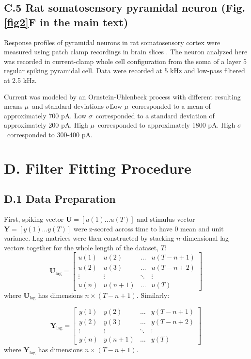 \subsection*{C.5 Rat somatosensory pyramidal neuron (Fig. \ref{fig2}F in the main text)}
Response profiles of pyramidal neurons in rat somatosensory cortex were measured using patch clamp recordings in brain slices \citep{rauch_lacamera_fusi2003noise}. The neuron analyzed here was recorded in current-clamp whole cell configuration from the soma of a layer 5 regular spiking pyramidal cell. Data were recorded at 5 kHz and low-pass filtered at 2.5 kHz.

Current was modeled by an Ornstein-Uhlenbeck process with different resulting means $\mu$\ and standard deviations $\sigma$\. Low $\mu$\ corresponded to a mean of approximately 700 pA. Low $\sigma$\ corresponded to a standard deviation of approximately 200 pA. High $\mu$\ corresponded to approximately 1800 pA. High $\sigma$\ corresponded to 300-400 pA.

\section*{D. Filter Fitting Procedure}
\subsection*{D.1 Data Preparation}
First, spiking vector $\mathbf{U}=[u(1)\dots u(T)]$ and stimulus vector $\mathbf{Y}=[y(1)\dots y(T)]$ were z-scored across time to have 0 mean and unit variance.
Lag matrices were then constructed by stacking $n$-dimensional lag vectors together for the whole length of the dataset, $T$:
\[
\mathbf{U}_{\text{lag}} = \begin{bmatrix}
     u(1) & u(2) & \ldots & u(T-n+1) \\
    u(2) & u(3) & \ldots & u(T-n+2) \\
    \vdots & \vdots & \ddots & \vdots  \\
    u(n) & u(n+1) & \ldots & u(T)
\end{bmatrix}
\]
where $\mathbf{U}_{\text{lag}}$ has dimensions $n \times (T-n+1)$. Similarly:

\[
\mathbf{Y}_{\text{lag}} = \begin{bmatrix}
    y(1) & y(2) & \ldots & y(T-n+1) \\
    y(2) & y(3) & \ldots & y(T-n+2) \\
    \vdots & \vdots & \ddots & \vdots  \\
    y(n) & y(n+1) & \ldots & y(T)
\end{bmatrix}
\]
where $\mathbf{Y}_{\text{lag}}$ has dimensions $n \times (T-n+1)$.

